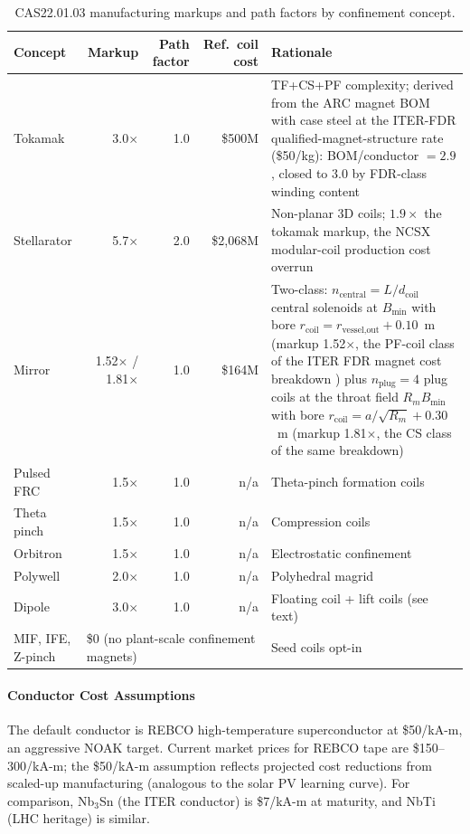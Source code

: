 \documentclass{article}
\begin{document}
\begin{table}[htbp]
\caption{CAS22.01.03 manufacturing markups and path factors by confinement concept.}
\label{tab:cas2203-markup}
\centering
\small
\begin{tabular}{lrrr p{6.6cm}}
\toprule
Concept & Markup & Path factor & Ref.\ coil cost & Rationale \\
\midrule
Tokamak     &  3.0$\times$ & 1.0 & \$500M & TF+CS+PF complexity; derived from the ARC magnet BOM \citep{sorbom2015arc} with case steel at the ITER-FDR qualified-magnet-structure rate (\$50/kg): BOM/conductor $=2.9$, closed to 3.0 by FDR-class winding content \citep{huguet2001iter} \\
Stellarator &  5.7$\times$ & 2.0 & \$2{,}068M & Non-planar 3D coils; $1.9\times$ the tokamak markup, the {NCSX} modular-coil production cost overrun \citep{neilson2010ncsx} \\
Mirror      &  1.52$\times$ / 1.81$\times$ & 1.0 & \$164M & Two-class: $n_{\text{central}}=L/d_{\text{coil}}$ central solenoids at $B_{\min}$ with bore $r_{\text{coil}} = r_{\text{vessel,out}} + 0.10$~m (markup 1.52$\times$, the PF-coil class of the ITER FDR magnet cost breakdown \citep{huguet2001iter}) plus $n_{\text{plug}}=4$ plug coils at the throat field $R_m B_{\min}$ with bore $r_{\text{coil}} = a/\sqrt{R_m} + 0.30$~m (markup 1.81$\times$, the CS class of the same breakdown) \\
Pulsed FRC  &  1.5$\times$ & 1.0 & n/a & Theta-pinch formation coils \\
Theta pinch &  1.5$\times$ & 1.0 & n/a & Compression coils \\
Orbitron    &  1.5$\times$ & 1.0 & n/a & Electrostatic confinement \\
Polywell    &  2.0$\times$ & 1.0 & n/a & Polyhedral magrid \\
Dipole      &  3.0$\times$ & 1.0 & n/a & Floating coil + lift coils (see text) \\
MIF, IFE, Z-pinch & \multicolumn{3}{l}{\$0 (no plant-scale confinement magnets)} & Seed coils opt-in \\
\bottomrule
\end{tabular}
\end{table}

\paragraph{Conductor Cost Assumptions}
The default conductor is REBCO high-temperature superconductor at
\$50/kA-m, an aggressive NOAK target. Current market prices for
REBCO tape are \$150--300/kA-m; the \$50/kA-m assumption reflects
projected cost reductions from scaled-up manufacturing (analogous to
the solar PV learning curve). For comparison, Nb$_3$Sn (the ITER
conductor) is \$7/kA-m at maturity, and NbTi (LHC heritage) is
similar.
\end{document}
